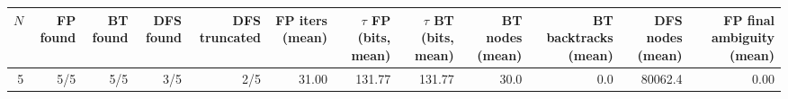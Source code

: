 \begin{tabular}{r r r r r r r r r r r r}%
\hline%
$N$&\textbf{FP found}&\textbf{BT found}&\textbf{DFS found}&\textbf{DFS truncated}&\textbf{FP iters (mean)}&\textbf{$\tau$ FP (bits, mean)}&\textbf{$\tau$ BT (bits, mean)}&\textbf{BT nodes (mean)}&\textbf{BT backtracks (mean)}&\textbf{DFS nodes (mean)}&\textbf{FP final ambiguity (mean)}\\%
\hline%
5&5/5&5/5&3/5&2/5&31.00&131.77&131.77&30.0&0.0&80062.4&0.00\\%
\hline%
\end{tabular}

